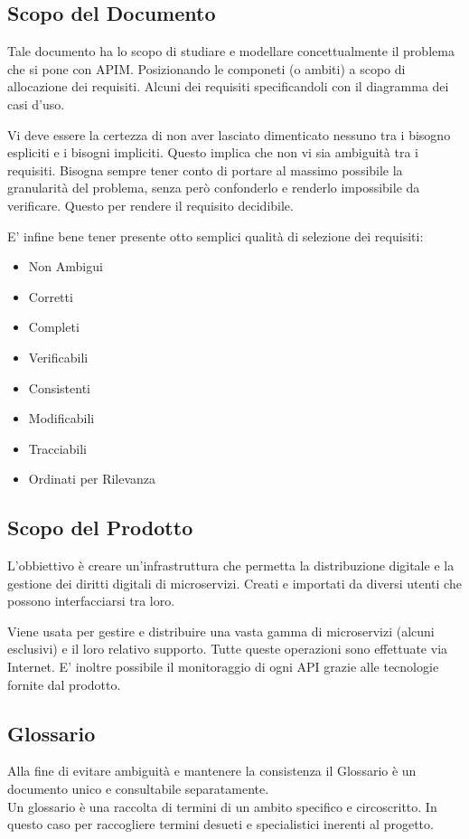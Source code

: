 \documentclass[12pt,a4paper,titlepage]{article}
\begin{document}
\subsection{Scopo del Documento}
Tale documento ha lo scopo di studiare e modellare concettualmente il problema che si pone con APIM. Posizionando le componeti (o ambiti) a scopo di allocazione dei requisiti. Alcuni dei requisiti specificandoli con il diagramma dei casi d'uso.

Vi deve essere la certezza di non aver lasciato dimenticato nessuno tra i bisogno espliciti e i bisogni impliciti. Questo implica che non vi sia ambiguità tra i requisiti.
Bisogna sempre tener conto di portare al massimo possibile la granularità del problema, senza però confonderlo e renderlo impossibile da verificare. Questo per rendere il requisito decidibile.

E' infine bene tener presente otto semplici qualità di selezione dei requisiti:
\begin{itemize}
\item Non Ambigui
\item Corretti
\item Completi
\item Verificabili
\item Consistenti
\item Modificabili
\item Tracciabili
\item Ordinati per Rilevanza
\end{itemize}
\subsection{Scopo del Prodotto}
L'obbiettivo è creare un'infrastruttura che permetta la distribuzione digitale e la gestione dei diritti digitali di microservizi. Creati e importati da diversi utenti che possono interfacciarsi tra loro.

Viene usata per gestire e distribuire una vasta gamma di microservizi (alcuni esclusivi) e il loro relativo supporto. Tutte queste operazioni sono effettuate via Internet.
E' inoltre possibile il monitoraggio di ogni API grazie alle tecnologie fornite dal prodotto. 
\subsection{Glossario}
Alla fine di evitare ambiguità e mantenere la consistenza il Glossario è un documento unico e consultabile separatamente. \\
Un glossario è una raccolta di termini di un ambito specifico e circoscritto. In questo caso per raccogliere termini desueti e specialistici inerenti al progetto. 
\\
\end{document}
